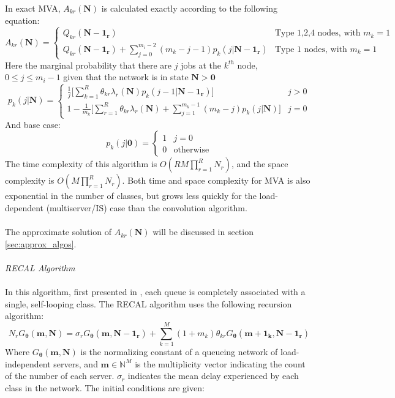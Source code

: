 In exact MVA, \(A_{kr}(\mathbf{N})\) is calculated exactly according to the following equation:
\[A_{kr}(\mathbf{N}) = 
\begin{cases} 
Q_{kr}(\mathbf{N-1_r}) & \text{Type 1,2,4 nodes, with }m_k = 1 \\ 
Q_{kr}(\mathbf{N-1_r}) + \sum_{j=0}^{m_i-2} (m_k - j - 1)p_k(j|\mathbf{N-1_r}) & \text{Type 1 nodes, with } m_k = 1
\end{cases}
\]
Here the marginal probability that there are \(j\) jobs at the \(k^{th}\) node, \(0 \leq j \leq m_i-1\) given that the network is in state \(\mathbf{N>0}\)
\[
p_k(j|\mathbf{N}) = 
\begin{cases} 
\frac{1}{j} \bigg[ \sum_{k=1}^R \theta_{kr} \lambda_r(\mathbf{N}) p_k(j-1|\mathbf{N-1_r}) \bigg] & j > 0\\ 
1 - \frac{1}{m_k} \bigg[ \sum_{r=1}^R \theta_{kr} \lambda_r(\mathbf{N}) + \sum_{j=1}^{m_k-1}(m_k - j)p_k(j|\mathbf{N})\bigg]  & j=0 
\end{cases}
\]
And base case:
\[ p_k(j|\mathbf{0}) =  \begin{cases} 1  & j=0 \\ 0 & \text{otherwise} \end{cases} \]
The time complexity of this algorithm is \(O(RM \prod_{r=1}^R N_r)\), and the space complexity is \(O(M \prod_{r=1}^R N_r)\). Both time and space complexity for MVA is also exponential in the number of classes, but grows less quickly for the load-dependent (multiserver/IS) case than the convolution algorithm.
\\\\
The approximate solution of \(A_{kr}(\mathbf{N})\) will be discussed in section \ref{sec:approx_algos}. 
\\\\
\textit{{\large RECAL Algorithm}}
\\\\
In this algorithm, first presented in \cite{Conway1986RECAL---aNetworks}, each queue is completely associated with a single, self-looping class. The RECAL algorithm uses the following recursion algorithm:
\begin{equation}
    N_r G_{\boldsymbol{\theta}}(\mathbf{m,N}) = \sigma_r G_{\boldsymbol{\theta}}(\mathbf{m,N-1_r}) + \sum_{k=1}^M (1 + m_k) \theta_{kr} G_{\boldsymbol{\theta}}(\mathbf{m+1_k,N-1_r})
\end{equation}
Where \(G_{\boldsymbol{\theta}}(\mathbf{m,N})\) is the normalizing constant of a queueing network of load-independent servers, and \(\mathbf{m} \in \mathbb{N}^M\) is the multiplicity vector indicating the count of the number of each server. \(\sigma_r\) indicates the mean delay experienced by each class in the network. The initial conditions are given:
